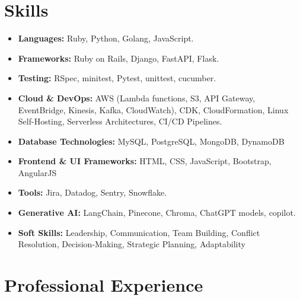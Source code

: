 \documentclass[a4paper,10pt]{article}
\begin{document}
\section*{Skills}
\sectionline
\vspace{-1em}
\begin{itemize}[leftmargin=0.5cm]
	\item \textbf{Languages:} Ruby, Python, Golang, JavaScript.
	\item \textbf{Frameworks:} Ruby on Rails, Django, FastAPI, Flask.
	\item \textbf{Testing:} RSpec, minitest, Pytest, unittest, cucumber.
	\item \textbf{Cloud \& DevOps:} AWS (Lambda functions, S3, API Gateway,
	      EventBridge, Kinesis, Kafka, CloudWatch), CDK, CloudFormation, Linux
	      Self-Hosting, Serverless Architectures, CI/CD Pipelines.
	\item \textbf{Database Technologies:} MySQL, PostgreSQL, MongoDB, DynamoDB
	\item \textbf{Frontend \& UI Frameworks:} HTML, CSS, JavaScript, Bootstrap, AngularJS
	\item \textbf{Tools:} Jira, Datadog, Sentry, Snowflake.
	\item \textbf{Generative AI:} LangChain, Pinecone, Chroma, ChatGPT models, copilot.
	\item \textbf{Soft Skills:} Leadership, Communication, Team Building,
	      Conflict Resolution, Decision-Making, Strategic Planning, Adaptability
\end{itemize}

\section*{Professional Experience}
\sectionline
\vspace{-1em}
\end{document}
